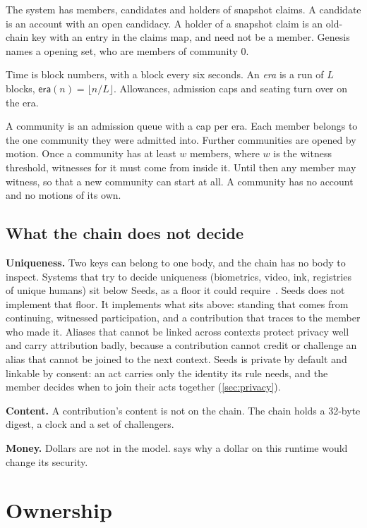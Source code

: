 \documentclass[11pt,a4paper]{article}
\theoremstyle{definition}
\theoremstyle{plain}
\theoremstyle{remark}
\newcommand{\era}{\mathsf{era}}
\begin{document}
The system has members, candidates and holders of snapshot claims. A candidate is an account with an open candidacy. A holder of a snapshot claim is an old-chain key with an entry in the claims map, and need not be a member. Genesis names a opening set, who are members of community $0$.

Time is block numbers, with a block every six seconds. An \emph{era} is a run of $L$ blocks, $\era(n) = \lfloor n / L \rfloor$. Allowances, admission caps and seating turn over on the era.

A community is an admission queue with a cap per era. Each member belongs to the one community they were admitted into. Further communities are opened by motion. Once a community has at least $w$ members, where $w$ is the witness threshold, witnesses for it must come from inside it. Until then any member may witness, so that a new community can start at all. A community has no account and no motions of its own.

\subsection{What the chain does not decide}

\textbf{Uniqueness.} Two keys can belong to one body, and the chain has no body to inspect. Systems that try to decide uniqueness (biometrics, video, ink, registries of unique humans) sit below Seeds, as a floor it could require~\cite{worldcoin2023,individuality2026}. Seeds does not implement that floor. It implements what sits above: standing that comes from continuing, witnessed participation, and a contribution that traces to the member who made it. Aliases that cannot be linked across contexts protect privacy well and carry attribution badly, because a contribution cannot credit or challenge an alias that cannot be joined to the next context. Seeds is private by default and linkable by consent: an act carries only the identity its rule needs, and the member decides when to join their acts together (\cref{sec:privacy}).

\textbf{Content.} A contribution's content is not on the chain. The chain holds a 32-byte digest, a clock and a set of challengers.

\textbf{Money.} Dollars are not in the model.  says why a dollar on this runtime would change its security.

\section{Ownership}
\label{sec:ownership}
\end{document}
